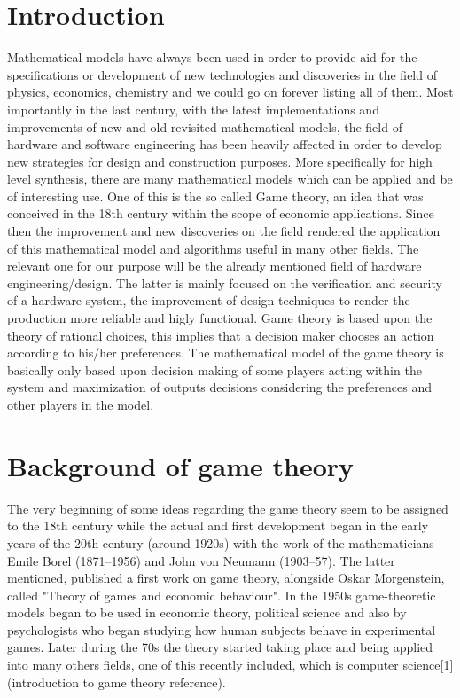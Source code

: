 \documentclass[conference]{IEEEtran}
\begin{document}
\section{Introduction}
Mathematical models have always been used in order to provide aid for the specifications or development of new technologies and discoveries in the field of physics, economics, chemistry and we could go on forever listing all of them. Most importantly in the last century, with the latest implementations and improvements of new and old revisited mathematical models, the field of hardware and software engineering has been heavily affected in order to develop new strategies for design and construction purposes. More specifically for high level synthesis, there are many mathematical models which can be applied and be of interesting use. One of this is the so called Game theory, an idea that was conceived in the 18th century within the scope of economic applications. Since then the improvement and new discoveries on the field rendered the application of this mathematical model and algorithms useful in many other fields. The relevant one for our purpose will be the already mentioned field of hardware engineering/design. The latter is mainly focused on the verification and security of a hardware system, the improvement of design techniques to render the production more reliable and higly functional. Game theory is based upon the theory of rational choices, this implies that a decision maker chooses an action according to his/her preferences. The mathematical model of the game theory is basically only based upon decision making of some players acting within the system and maximization of outputs decisions considering the preferences and other players in the model.



\section{Background of game theory}
The very beginning of some ideas regarding the game theory seem to be assigned to the 18th century while the actual and first development began in the early years of the 20th century (around 1920s) with the work of the mathematicians Emile Borel (1871–1956) and John von Neumann (1903–57). The latter mentioned, published a first work on game theory, alongside Oskar Morgenstein, called "Theory of games and economic behaviour". In the 1950s game-theoretic models began to be used in economic theory, political science and also by psychologists who began studying how human subjects behave in experimental games. Later during the 70s the theory started taking place and being applied into many others fields, one of this recently included, which is computer science[1] (introduction to game theory reference).
\end{document}
